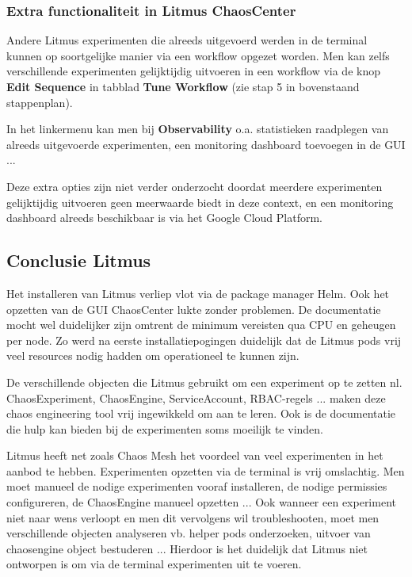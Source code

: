 \subsubsection{Extra functionaliteit in Litmus ChaosCenter}

Andere Litmus experimenten die alreeds uitgevoerd werden in de terminal kunnen op soortgelijke manier via een workflow opgezet worden. Men kan zelfs verschillende experimenten gelijktijdig uitvoeren in een workflow via de knop {\bf Edit Sequence} in tabblad {\bf Tune Workflow} (zie stap 5 in bovenstaand stappenplan). 

In het linkermenu kan men bij {\bf Observability} o.a. statistieken raadplegen van alreeds uitgevoerde experimenten, een monitoring dashboard toevoegen in de GUI ...

Deze extra opties zijn niet verder onderzocht doordat meerdere experimenten gelijktijdig uitvoeren geen meerwaarde biedt in deze context, en een monitoring dashboard alreeds beschikbaar is via het Google Cloud Platform. 

\subsection{Conclusie Litmus}

Het installeren van Litmus verliep vlot via de package manager Helm. Ook het opzetten van de GUI ChaosCenter lukte zonder problemen. De documentatie mocht wel duidelijker zijn omtrent de minimum vereisten qua CPU en geheugen per node. Zo werd na eerste installatiepogingen duidelijk dat de Litmus pods vrij veel resources nodig hadden om operationeel te kunnen zijn.   

De verschillende objecten die Litmus gebruikt om een experiment op te zetten nl. ChaosExperiment, ChaosEngine, ServiceAccount, RBAC-regels ... maken deze chaos engineering tool vrij ingewikkeld om aan te leren. Ook is de documentatie die hulp kan bieden bij de experimenten soms moeilijk te vinden. 

Litmus heeft net zoals Chaos Mesh het voordeel van veel experimenten in het aanbod te hebben. 
Experimenten opzetten via de terminal is vrij omslachtig. Men moet manueel de nodige experimenten vooraf installeren, de nodige permissies configureren, de ChaosEngine manueel opzetten ...
Ook wanneer een experiment niet naar wens verloopt en men dit vervolgens wil troubleshooten, moet men verschillende objecten analyseren vb. helper pods onderzoeken, uitvoer van chaosengine object bestuderen ... Hierdoor is het duidelijk dat Litmus niet ontworpen is om via de terminal experimenten uit te voeren.

